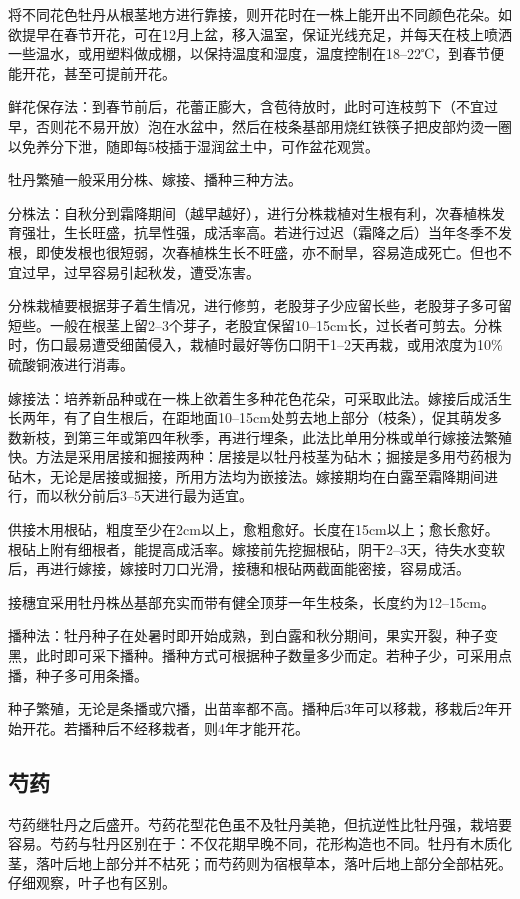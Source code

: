 \documentclass{ctexbook}
\begin{document}
将不同花色牡丹从根茎地方进行靠接，则开花时在一株上能开出不同颜色花朵。如欲提早在春节开花，可在12月上盆，移入温室，保证光线充足，并每天在枝上喷洒一些温水，或用塑料做成棚，以保持温度和湿度，温度控制在18--22℃，到春节便能开花，甚至可提前开花。

鲜花保存法：到春节前后，花蕾正膨大，含苞待放时，此时可连枝剪下（不宜过早，否则花不易开放）泡在水盆中，然后在枝条基部用烧红铁筷子把皮部灼烫一圈以免养分下泄，随即每5枝插于湿润盆土中，可作盆花观赏。

牡丹繁殖一般采用分株、嫁接、播种三种方法。

分株法：自秋分到霜降期间（越早越好），进行分株栽植对生根有利，次春植株发育强壮，生长旺盛，抗旱性强，成活率高。若进行过迟（霜降之后）当年冬季不发根，即使发根也很短弱，次春植株生长不旺盛，亦不耐旱，容易造成死亡。但也不宜过早，过早容易引起秋发，遭受冻害。

分株栽植要根据芽子着生情况，进行修剪，老股芽子少应留长些，老股芽子多可留短些。一般在根茎上留2--3个芽子，老股宜保留10--15cm长，过长者可剪去。分株时，伤口最易遭受细菌侵入，栽植时最好等伤口阴干1--2天再栽，或用浓度为10\%硫酸铜液进行消毒。

嫁接法：培养新品种或在一株上欲着生多种花色花朵，可采取此法。嫁接后成活生长两年，有了自生根后，在距地面10--15cm处剪去地上部分（枝条），促其萌发多数新枝，到第三年或第四年秋季，再进行埋条，此法比单用分株或单行嫁接法繁殖快。方法是采用居接和掘接两种：居接是以牡丹枝茎为砧木；掘接是多用芍药根为砧木，无论是居接或掘接，所用方法均为嵌接法。嫁接期均在白露至霜降期间进行，而以秋分前后3--5天进行最为适宜。

供接木用根砧，粗度至少在2cm以上，愈粗愈好。长度在15cm以上；愈长愈好。根砧上附有细根者，能提高成活率。嫁接前先挖掘根砧，阴干2--3天，待失水变软后，再进行嫁接，嫁接时刀口光滑，接穗和根砧两截面能密接，容易成活。

接穗宜采用牡丹株丛基部充实而带有健全顶芽一年生枝条，长度约为12--15cm。

播种法：牡丹种子在处暑时即开始成熟，到白露和秋分期间，果实开裂，种子变黑，此时即可采下播种。播种方式可根据种子数量多少而定。若种子少，可采用点播，种子多可用条播。

种子繁殖，无论是条播或穴播，出苗率都不高。播种后3年可以移栽，移栽后2年开始开花。若播种后不经移栽者，则4年才能开花。
\subsection{芍药}
芍药继牡丹之后盛开。芍药花型花色虽不及牡丹美艳，但抗逆性比牡丹强，栽培要容易。芍药与牡丹区别在于：不仅花期早晚不同，花形构造也不同。牡丹有木质化茎，落叶后地上部分并不枯死；而芍药则为宿根草本，落叶后地上部分全部枯死。仔细观察，叶子也有区别。
\end{document}
